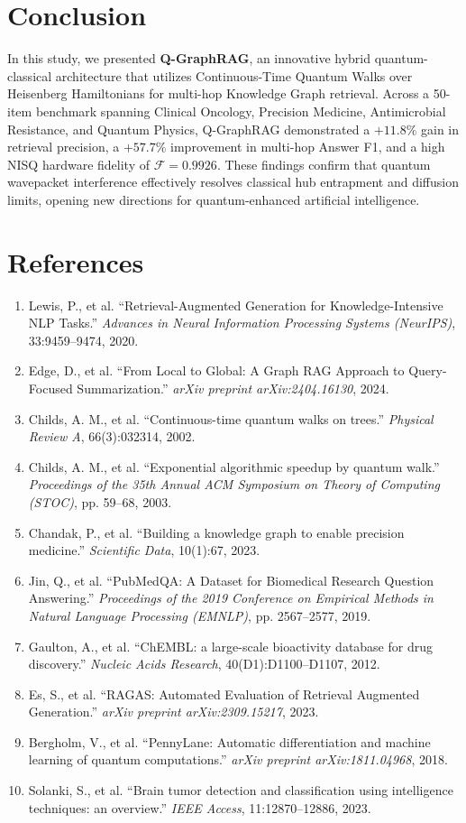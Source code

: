 \documentclass[11pt,a4paper]{article}
\begin{document}
\section{Conclusion}
In this study, we presented \textbf{Q-GraphRAG}, an innovative hybrid quantum-classical architecture that utilizes Continuous-Time Quantum Walks over Heisenberg Hamiltonians for multi-hop Knowledge Graph retrieval. Across a 50-item benchmark spanning Clinical Oncology, Precision Medicine, Antimicrobial Resistance, and Quantum Physics, Q-GraphRAG demonstrated a $+11.8\%$ gain in retrieval precision, a $+57.7\%$ improvement in multi-hop Answer F1, and a high NISQ hardware fidelity of $\mathcal{F} = 0.9926$. These findings confirm that quantum wavepacket interference effectively resolves classical hub entrapment and diffusion limits, opening new directions for quantum-enhanced artificial intelligence.

\section*{References}
\begin{enumerate}
    \item Lewis, P., et al. ``Retrieval-Augmented Generation for Knowledge-Intensive NLP Tasks.'' \textit{Advances in Neural Information Processing Systems (NeurIPS)}, 33:9459--9474, 2020.
    \item Edge, D., et al. ``From Local to Global: A Graph RAG Approach to Query-Focused Summarization.'' \textit{arXiv preprint arXiv:2404.16130}, 2024.
    \item Childs, A. M., et al. ``Continuous-time quantum walks on trees.'' \textit{Physical Review A}, 66(3):032314, 2002.
    \item Childs, A. M., et al. ``Exponential algorithmic speedup by quantum walk.'' \textit{Proceedings of the 35th Annual ACM Symposium on Theory of Computing (STOC)}, pp. 59--68, 2003.
    \item Chandak, P., et al. ``Building a knowledge graph to enable precision medicine.'' \textit{Scientific Data}, 10(1):67, 2023.
    \item Jin, Q., et al. ``PubMedQA: A Dataset for Biomedical Research Question Answering.'' \textit{Proceedings of the 2019 Conference on Empirical Methods in Natural Language Processing (EMNLP)}, pp. 2567--2577, 2019.
    \item Gaulton, A., et al. ``ChEMBL: a large-scale bioactivity database for drug discovery.'' \textit{Nucleic Acids Research}, 40(D1):D1100--D1107, 2012.
    \item Es, S., et al. ``RAGAS: Automated Evaluation of Retrieval Augmented Generation.'' \textit{arXiv preprint arXiv:2309.15217}, 2023.
    \item Bergholm, V., et al. ``PennyLane: Automatic differentiation and machine learning of quantum computations.'' \textit{arXiv preprint arXiv:1811.04968}, 2018.
    \item Solanki, S., et al. ``Brain tumor detection and classification using intelligence techniques: an overview.'' \textit{IEEE Access}, 11:12870--12886, 2023.
\end{enumerate}
\end{document}

